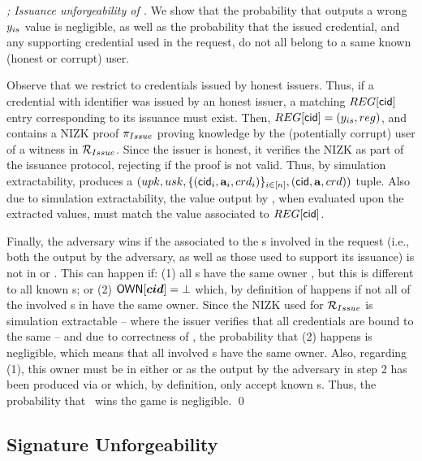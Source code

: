 \begin{proof}[; Issuance unforgeability of \CUASGen]
  We show that the probability that \fissue outputs a wrong $y_{is}$ value is
  negligible, as well as the probability that the issued credential, and any
  supporting credential used in the request, do not all belong to a same known
  (honest or corrupt) user.

  Observe that we restrict to credentials issued by honest issuers. Thus, if a
  credential with identifier \cid was issued by an honest issuer, a matching
  $\trans[\cid]$ entry corresponding to its issuance must exist.
  Then, $\trans[\cid] = (\yissue,\utrans)$, and \utrans contains a NIZK proof
  $\pi_{Issue}$ proving knowledge by the (potentially corrupt) user of a
  witness in $\mathcal{R}_{Issue}$. Since the issuer is honest, it verifies the
  NIZK as part of the issuance protocol, rejecting if the proof is not valid.
  Thus, by simulation extractability, \ExtractIssue produces a $(upk,usk,
  \lbrace (\mathsf{cid}_i,\mathbf{a}_i,crd_i) \rbrace_{i\in[n]},(\mathsf{cid},\mathbf{a},crd))$
  tuple. Also due to simulation extractability, the value output by \fissue,
  when evaluated upon the extracted values, must match the \yissue value
  associated to $\trans[\cid]$.

  Finally, the adversary wins if the \uid associated to the {\cid}s involved in
  the request (i.e., both the \cid output by the adversary, as well as those
  used to support its issuance) is not in \HU or \CU. This can happen if: (1)
  all {\cid}s have the same owner \uid, but this \uid is different to all known
  {\uid}s; or (2) $\mathsf{OWN}[\boldsymbol{cid}] = \bot$ which, by definition of \OWNR happens if
  not all of the involved {\cid}s in \scid have the same owner. Since the NIZK
  used for $\mathcal{R}_{Issue}$ is simulation extractable -- where the issuer
  verifies that all credentials are bound to the same \usk -- and due to
  correctness of \SBCM, the probability that (2) happens is negligible, which
  means that all involved {\cid}s have the same owner. Also, regarding (1), this
  owner must be in either \HU or \CU as the \cid output by the adversary in step
  2 has been produced via \ISSUE or \OBTISS which, by definition, only accept
  known {\uid}s. Thus, the probability that \adv~wins the \ExpForgeIssue game is
  negligible.
  \qed
\end{proof}

\subsection{Signature Unforgeability}

